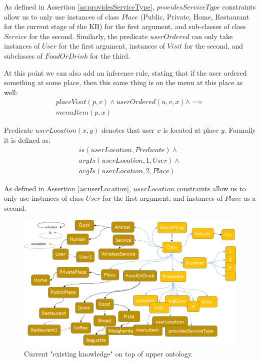 As defined in Assertion \ref{as:providesServiceType}, $providesServiceType$
constraints allow us to only use instances of class $Place$ (Public, Private, Home, Restaurant for the current stage of the KB) for the first argument, and 
sub-classes of class $Service$ for the second. Similarly, the predicate
$userOrdered$ can only take instances of $User$ for the first argument, 
instances of $Visit$ for the second, and subclasses of $FoodOrDrink$ for the
third.

At this point we can also add an inference rule, stating that if the user ordered
something at some place, then this same thing is on the menu at this place as
well:
\begin{equation}\label{rule:orderedMenu}
\begin{gathered}
	placeVisit(p,v) \land
	userOrdered(u,v,x) \land
	\implies \\
	menuItem(p,x) 
\end{gathered}
\end{equation}

\begin{definition}\label{def:userLocation}
Predicate $userLocation(x,y)$ denotes that user $x$ is located at place 
$y$. Formally it is defined as:
\begin{equation}\label{as:userLocation}
\begin{gathered}
    is(userLocation,Predicate) \land \\
	argIs(userLocation,1,User) \land\\
	argIs(userLocation,2, Place)
\end{gathered}
\end{equation}
\end{definition}
As defined in Assertion \ref{as:userLocation}, $userLocation$
constraints allow us to only use instances of class $User$ for the first
argument, and instances of $Place$ as a second.

\begin{figure}[H]
	\centering
		\includegraphics[width=1\textwidth]{figures/fullExistingKB.png}
	\caption{Current "existing knowledge" on top of upper ontology.}
	\label{fig:existingKB}
\end{figure}

